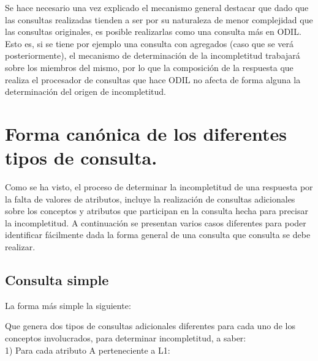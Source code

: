 Se hace necesario una vez explicado el mecanismo general destacar que dado que las consultas realizadas tienden a ser por su naturaleza de menor complejidad que las consultas originales, es posible realizarlas como una consulta más en ODIL. Esto es, si se tiene por ejemplo una consulta con agregados (caso que se verá posteriormente), el mecanismo de determinación de la incompletitud trabajará sobre los miembros del mismo, por lo que la composición de la respuesta que realiza el procesador de consultas que hace ODIL no afecta de forma alguna la determinación del origen de incompletitud.\\

\section{Forma canónica de los diferentes tipos de consulta.}\label{section-formaCanonica}

Como se ha visto, el proceso de determinar la incompletitud de una respuesta por la falta de valores de atributos, incluye la realización de consultas adicionales sobre los conceptos y atributos que participan en la consulta hecha para precisar la incompletitud. A continuación se presentan varios casos diferentes para poder identificar fácilmente dada la forma general de una consulta que consulta se debe realizar. \\

\subsection{Consulta simple}

La forma más simple la siguiente: 


Que genera dos tipos  de consultas adicionales diferentes para cada uno de los conceptos involucrados, para determinar incompletitud, a saber: \\

1) Para cada atributo A perteneciente a L1: 


